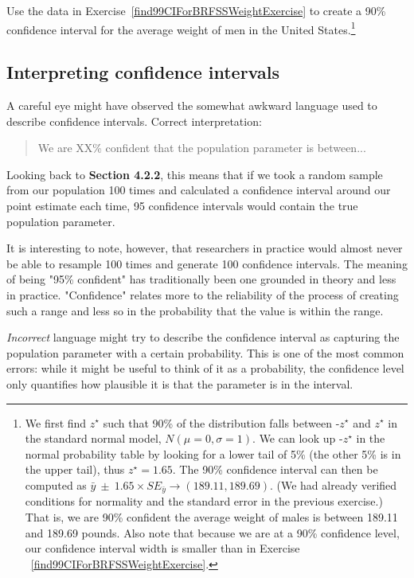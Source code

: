 \begin{exercise} \label{find90CIForBRFSSWeightExercise}
Use the data in Exercise~\ref{find99CIForBRFSSWeightExercise} to create a 90\% confidence interval for the average weight of men in the United States.\footnote{We first find $z^{\star}$ such that 90\% of the distribution falls between -$z^{\star}$ and $z^{\star}$ in the standard normal model, $N(\mu=0, \sigma=1)$. We can look up -$z^{\star}$ in the normal probability table by looking for a lower tail of 5\% (the other 5\% is in the upper tail), thus $z^{\star}=1.65$. The 90\% confidence interval can then be computed as $\bar{y}\ \pm\ 1.65\times SE_{\bar{y}} \to (189.11, 189.69)$. (We had already verified conditions for normality and the standard error in the previous exercise.) That is, we are 90\% confident the average weight of males is between 189.11 and 189.69 pounds. Also note that because we are at a 90\% confidence level, our confidence interval width is smaller than in Exercise ~\ref{find99CIForBRFSSWeightExercise}.}
\end{exercise}

\subsection{Interpreting confidence intervals}
\label{interpretingCIs}


A careful eye might have observed the somewhat awkward language used to describe confidence intervals. Correct interpretation:
\begin{quote}
We are XX\% confident that the population parameter is between...
\end{quote}

Looking back to \textbf{Section 4.2.2}, this means that if we took a random sample from our population 100 times and calculated a confidence interval around our point estimate each time, 95 confidence intervals would contain the true population parameter. 

It is interesting to note, however, that researchers in practice would almost never be able to resample 100 times and generate 100 confidence intervals. The meaning of being "95\% confident" has traditionally been one grounded in theory and less in practice. "Confidence" relates more to the reliability of the process of creating such a range and less so in the probability that the value is within the range. 

\emph{Incorrect} language might try to describe the confidence interval as capturing the population parameter with a certain probability. This is one of the most common errors: while it might be useful to think of it as a probability, the confidence level only quantifies how plausible it is that the parameter is in the interval. 


